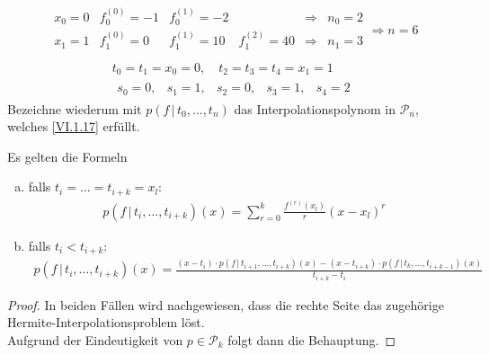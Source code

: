 \begin{Bspe}\label{6.1.13}
  \begin{align*}
    \begin{array}{ccccrc}
      x_0=0 & f_0^{(0)} = -1 & f_0^{(1)}= -2 
      && \Rightarrow & n_0=2 \\
      x_1=1 & f_1^{(0)} = 0 &  f_1^{(1)}= 10 & f_1^{(2)}=40               
                     &\Rightarrow & n_1=3 \\
    \end{array}\Longrightarrow n=6
  \end{align*}
  \begin{gather*}
    t_0 = t_1 =x_0=0, \quad t_2=t_3=t_4=x_1=1 \\
    \begin{array}{ccccc}
      s_0=0, & s_1=1, & s_2=0, & s_3=1, & s_4=2
    \end{array}
  \end{gather*}
  Bezeichne wiederum mit $p(f\,| \, t_0,\dots, t_n)$
  das Interpolationspolynom in $\mathcal{P}_n$,
  welches \eqref{VI.1.17} erfüllt.
\end{Bspe}

\begin{Leme}
  \label{6.1.14}
  Es gelten die Formeln
  \begin{enumerate}[a)]
  \item falls $t_i=\dots = t_{i+k}=x_l$:
    \begin{gather}
      p(f\,|\, t_i,\dots, t_{i+k})(x) 
      = \sum_{r=0}^{k}\frac{f^{(r)}(x_l)}{r}(x-x_l)^r
      \label{VI.1.19}
    \end{gather}
  \item falls $t_i<t_{i+k} $:
    \begin{gather}
      p(f\,|\, t_i,\dots, t_{i+k})(x) 
      = \frac{(x-t_i)\cdot p(f\,|\, t_{i+1},\dots, t_{i+k})(x)
        - (x-t_{i+k})\cdot p(f\,|\,t_k,\dots, t_{i+k-1})(x)}
      {t_{i+k}-t_i}
      \label{VI.1.20}
    \end{gather}
  \end{enumerate}
\end{Leme}

\begin{proof}
  In beiden Fällen wird nachgewiesen, dass die rechte Seite
  das zugehörige Hermite-Interpolationsproblem löst.\\
  Aufgrund der Eindeutigkeit von $p\in\mathcal{P}_k$
  folgt dann die Behauptung.
\end{proof}



